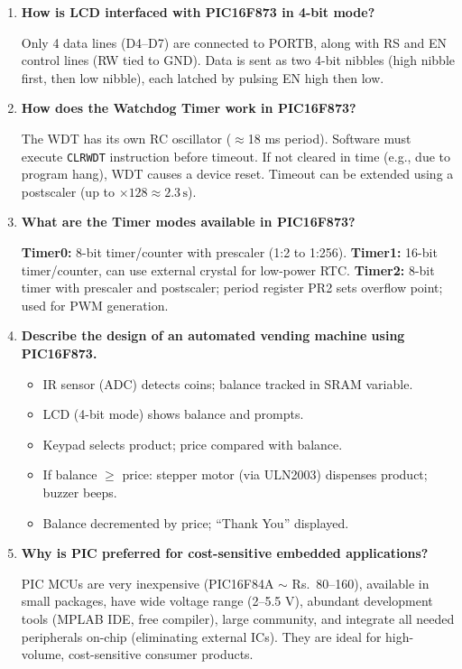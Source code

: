 \documentclass[12pt,a4paper]{article}
\newcommand{\Q}[1]{\textbf{#1}\par\noindent\ignorespaces}
\begin{document}
\begin{tcolorbox}[exambox, title={\textbf{Frequently Asked / Viva Questions}}]
\begin{enumerate}[topsep=0pt, label=\textbf{Q\arabic*.}, itemsep=5pt]
  \item \Q{How is LCD interfaced with PIC16F873 in 4-bit mode?}
    Only 4 data lines (D4--D7) are connected to PORTB, along with RS and EN control lines (RW tied to GND). Data is sent as two 4-bit nibbles (high nibble first, then low nibble), each latched by pulsing EN high then low.
  \item \Q{How does the Watchdog Timer work in PIC16F873?}
    The WDT has its own RC oscillator ($\approx$18 ms period). Software must execute \texttt{CLRWDT} instruction before timeout. If not cleared in time (e.g., due to program hang), WDT causes a device reset. Timeout can be extended using a postscaler (up to $\times 128 \approx 2.3\,\text{s}$).
  \item \Q{What are the Timer modes available in PIC16F873?}
    \textbf{Timer0:} 8-bit timer/counter with prescaler (1:2 to 1:256). \textbf{Timer1:} 16-bit timer/counter, can use external crystal for low-power RTC. \textbf{Timer2:} 8-bit timer with prescaler and postscaler; period register PR2 sets overflow point; used for PWM generation.
  \item \Q{Describe the design of an automated vending machine using PIC16F873.}
    \begin{itemize}[leftmargin=*, itemsep=1pt, topsep=2pt]
      \item IR sensor (ADC) detects coins; balance tracked in SRAM variable.
      \item LCD (4-bit mode) shows balance and prompts.
      \item Keypad selects product; price compared with balance.
      \item If balance $\geq$ price: stepper motor (via ULN2003) dispenses product; buzzer beeps.
      \item Balance decremented by price; ``Thank You'' displayed.
    \end{itemize}
  \item \Q{Why is PIC preferred for cost-sensitive embedded applications?}
    PIC MCUs are very inexpensive (PIC16F84A $\sim$ Rs.~80--160), available in small packages, have wide voltage range (2--5.5 V), abundant development tools (MPLAB IDE, free compiler), large community, and integrate all needed peripherals on-chip (eliminating external ICs). They are ideal for high-volume, cost-sensitive consumer products.
\end{enumerate}
\end{tcolorbox}
\end{document}
